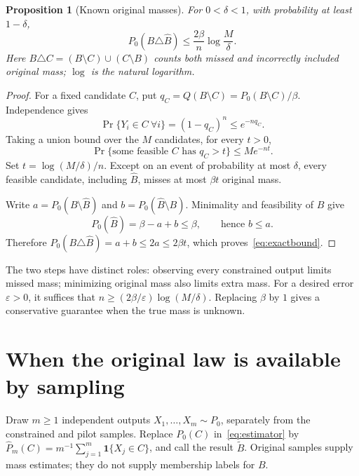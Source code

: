 \documentclass[10pt,letterpaper]{article}
\theoremstyle{typed}
\newtheorem{proposition}[lemma]{Proposition}
\begin{document}
\begin{proposition}[Known original masses]
For $0<\delta<1$, with probability at least $1-\delta$,
\begin{equation}
  \boxed{\quad P_0(B\triangle\widehat B)
    \leq \frac{2\beta}{n}\log\frac{M}{\delta}.\quad}
  \label{eq:exactbound}
\end{equation}
Here $B\triangle C=(B\setminus C)\cup(C\setminus B)$ counts both missed
and incorrectly included original mass; $\log$ is the natural logarithm.
\end{proposition}
\begin{proof}
For a fixed candidate $C$, put
$q_C=Q(B\setminus C)=P_0(B\setminus C)/\beta$. Independence gives
\[
  \Pr\{Y_i\in C\ \forall i\}=(1-q_C)^n\leq e^{-nq_C}.
\]
Taking a union bound over the $M$ candidates, for every $t>0$,
\[
 \Pr\{\text{some feasible }C\text{ has }q_C>t\}\leq M e^{-nt}.
\]
Set $t=\log(M/\delta)/n$. Except on an event of probability at most
$\delta$, every feasible candidate, including $\widehat B$, misses
at most $\beta t$ original mass.

Write $a=P_0(B\setminus\widehat B)$ and
$b=P_0(\widehat B\setminus B)$. Minimality and feasibility of $B$ give
\[
 P_0(\widehat B)=\beta-a+b\leq\beta,
 \qquad\text{hence }b\leq a.
\]
Therefore $P_0(B\triangle\widehat B)=a+b\leq2a\leq2\beta t$,
which proves~\eqref{eq:exactbound}.
\end{proof}

The two steps have distinct roles: observing every constrained output
limits missed mass; minimizing original mass also limits extra mass.
For a desired error $\varepsilon>0$, it suffices that
$n\geq(2\beta/\varepsilon)\log(M/\delta)$. Replacing $\beta$ by $1$
gives a conservative guarantee when the true mass is unknown.

\section{When the original law is available by sampling}

Draw $m\geq1$ independent outputs $X_1,\ldots,X_m\sim P_0$, separately
from the constrained and pilot samples. Replace $P_0(C)$ in~\eqref{eq:estimator} by
$\widehat P_m(C)=m^{-1}\sum_{j=1}^m\mathbf1\{X_j\in C\}$, and call the
result $\widetilde B$. Original samples supply mass estimates; they do
not supply membership labels for $B$.
\end{document}
